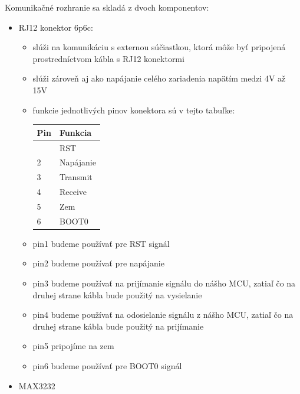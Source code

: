 Komunikačné rozhranie sa skladá z dvoch komponentov:
\begin{itemize}
\item 
  RJ12 konektor 6p6c:
  \begin{itemize}
   \item 
  slúži na komunikáciu s externou súčiastkou, ktorá môže byť pripojená prostredníctvom kábla s RJ12 konektormi
  \item 
  slúži zároveň aj ako napájanie celého zariadenia napätím medzi 4V až 15V
  \item 
  funkcie jednotlivých pinov konektora sú v tejto tabuľke:

\begin{longtable}[]{@{}ll@{}}
  \toprule\noalign{}
  Pin & Funkcia\\
  \midrule\noalign{}
  \endhead
  \bottomrule\noalign{}
  \endlastfoot
  1 & RST \\  
  2 & Napájanie\\
  3 & Transmit \\
  4 & Receive \\
  5 & Zem \\
  6 & BOOT0\\
  \end{longtable}

\item
  pin1 budeme používať pre RST signál
\item
  pin2 budeme používať pre napájanie
\item
  pin3 budeme používať na prijímanie signálu do nášho MCU, zatiaľ čo na druhej strane kábla bude použitý na vysielanie
\item
  pin4 budeme používať na odosielanie signálu z nášho MCU, zatiaľ čo na druhej strane kábla bude použitý na prijímanie
\item
  pin5 pripojíme na zem
\item
  pin6 budeme používať pre BOOT0 signál
  \end{itemize}
  \item 
  MAX3232


\end{itemize}
